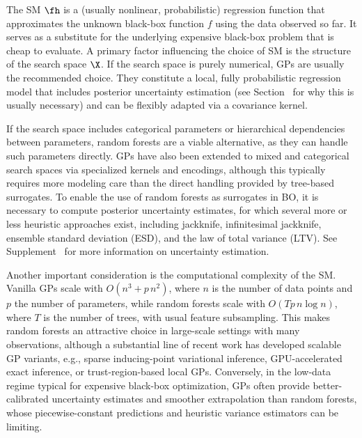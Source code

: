 \documentclass[12pt,letterpaper]{article}
\begin{document}
\label{sec:surrogate-model}

The SM $\fh$ is a (usually nonlinear, probabilistic) regression function that approximates the unknown black-box function $f$ using the data observed so far.
It serves as a substitute for the underlying expensive black-box problem that is cheap to evaluate.
A primary factor influencing the choice of SM is the structure of the search space $\X$.
If the search space is purely numerical, GPs\cite{rasmussen2005} are usually the recommended choice\cite{garnett2023}. 
They constitute a local, fully probabilistic regression model that includes posterior uncertainty estimation (see Section~ for why this is usually necessary) and can be flexibly adapted via a covariance kernel. 

If the search space includes categorical parameters or hierarchical dependencies between parameters, random forests are a viable alternative, as they can handle such parameters directly\cite{hutter2011,eggensperger2021}.
GPs have also been extended to mixed and categorical search spaces via specialized kernels and encodings\cite{garrido-merchan2020,ru2020,daulton2022}, although this typically requires more modeling care than the direct handling provided by tree-based surrogates.
To enable the use of random forests as surrogates in BO, it is necessary to compute posterior uncertainty estimates, for which several more or less heuristic approaches exist, including jackknife\cite{wager2014}, infinitesimal jackknife\cite{wager2014}, ensemble standard deviation (ESD)\cite{hutter2011}, and the law of total variance (LTV)\cite{hutter2014}.
See Supplement~ for more information on uncertainty estimation.

Another important consideration is the computational complexity of the SM.
Vanilla GPs scale with $O(n^3 + p\,n^2)$, where $n$ is the number of data points and $p$ the number of parameters, while random forests scale with $O(T p\,n \log{n})$, where $T$ is the number of trees, with usual feature subsampling.
This makes random forests an attractive choice in large-scale settings with many observations\cite{egele2023}, although a substantial line of recent work has developed scalable GP variants, e.g., sparse inducing-point variational inference\cite{hensman2013}, GPU-accelerated exact inference\cite{wang2019}, or trust-region-based local GPs\cite{eriksson2019}.
Conversely, in the low-data regime typical for expensive black-box optimization, GPs often provide better-calibrated uncertainty estimates and smoother extrapolation than random forests, whose piecewise-constant predictions and heuristic variance estimators can be limiting.
\end{document}
